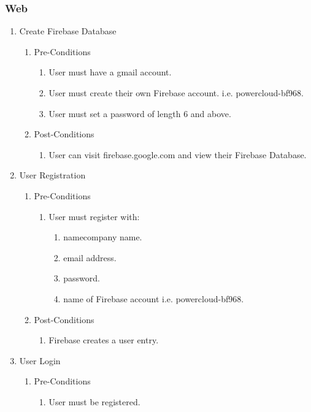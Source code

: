 \documentclass{article}
\begin{document}
	\subsubsection{Web}
	\begin{enumerate}
		\item	Create Firebase Database
		\begin{enumerate}
			\item  Pre-Conditions
			\begin{enumerate}
				\item	User must have a gmail account.
				\item	User must create their own Firebase account. i.e. powercloud-bf968.
				\item	User must set a password of length 6 and above.
			\end{enumerate}
			\item  Post-Conditions		
			\begin{enumerate}
				\item	User can visit firebase.google.com and view their Firebase Database.
			\end{enumerate}
		\end{enumerate}
		\item	User Registration
		\begin{enumerate}
			\item  Pre-Conditions
			\begin{enumerate}
				\item	User must register with:
				\begin{enumerate}
					\item	namecompany name.
					\item	email address.
					\item	password.
					\item	name of Firebase account i.e. powercloud-bf968.
				\end{enumerate}
			\end{enumerate}
			\item  Post-Conditions		
			\begin{enumerate}
				\item	Firebase creates a user entry.
			\end{enumerate}
		\end{enumerate}
		\item	User Login
		\begin{enumerate}
			\item  Pre-Conditions
			\begin{enumerate}
				\item	User must be registered.

\end{enumerate}
\end{enumerate}
\end{enumerate}
\end{document}
